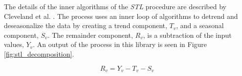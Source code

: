 The details of the inner algorithms of the \emph{STL} procedure are described by Cleveland et al. \cite{cleveland1990stl}. The process uses an inner loop of algorithms to detrend and deseasonalize the data by creating a trend component, $T_v$, and a seasonal component, $S_v$. The remainder component, $R_v$, is a subtraction of the input values, $Y_v$. An output of the process in this library is seen in Figure \ref{fig:stl_decomposition}. 

\begin{equation}
\label{eq:stl_residualscalc}
R_v = Y_v - T_v - S_v
\end{equation}

